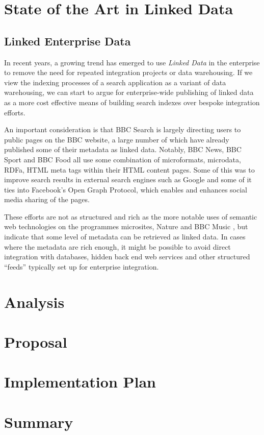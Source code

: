 \documentclass[10pt,a4paper]{report}
\begin{document}
\chapter{State of the Art in Linked Data}
\label{stateoftheart}

\section{Linked Enterprise Data}

In recent years, a growing trend has emerged to use
\emph{Linked Data} in the enterprise to remove the need
for repeated integration projects or data warehousing.
\cite{allemang2010semantic} If we view the indexing processes
of a search application as a variant of data warehousing,
we can start to argue for enterprise-wide publishing of
linked data as a more cost effective means of building search
indexes over bespoke integration efforts.

An important consideration is that BBC Search is largely directing
users to public pages on the BBC website, a large number of which have
already published some of their metadata as linked data. Notably, BBC News,
BBC Sport and BBC Food all use some combination
of microformats, microdata, RDFa, HTML meta tags within their HTML content
pages. Some of this was to improve search results in external search engines
such as Google and some of it ties into Facebook's Open Graph Protocol, which
enables and enhances social media sharing of the pages.

These efforts are not as structured and rich as the more notable uses
of semantic web technologies on the programmes microsites, Nature and BBC
Music \cite{}, but indicate that some level of metadata can be retrieved
as linked data. In cases where the metadata are rich enough, it might be
possible to avoid direct integration with databases, hidden back end
web services and other structured ``feeds'' typically set up for enterprise
integration.

\chapter{Analysis}

\chapter{Proposal}

\chapter{Implementation Plan}

\chapter{Summary}



\end{document}

